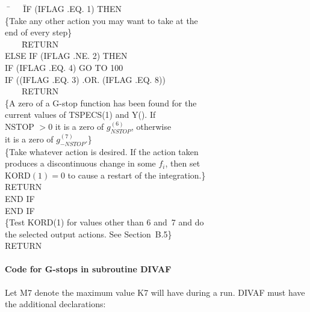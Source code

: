 \documentclass[twoside]{MATH77}
\begin{document}
\begin{tabbing}
\phantom{100}\,\=\ \ \ \ \=IF (IFLAG .EQ. 1) THEN\\

\{Take any other action you may want to take at the\\
\>end of every step\}\\

\>\>\ \ \ \ \=RETURN\\

\>\>ELSE IF (IFLAG .NE. 2) THEN\\

\>\>\>IF (IFLAG .EQ. 4) GO TO 100\\

\>\>\>IF ((IFLAG .EQ. 3) .OR. (IFLAG .EQ. 8))\\
\>\>\ \ \ \ RETURN\\

\{A zero of a G-stop function has been found for the\\
\>current values of TSPECS(1) and Y(). If\\
\>NSTOP $>0$ it is a zero of $g_{NSTOP}^{(6)}$, otherwise\\
\>it is a zero of $g_{-NSTOP}^{(7)}$.\}\\

\{Take whatever action is desired. If the action taken\\
\>produces a discontinuous change in some $f_i$, then set\\
\>KORD$(1)=0$ to cause a restart of the integration.\}\\

\>\>\>RETURN\\

\>\>END IF\\

\>END IF\\

\{Test KORD(1) for values other than 6 and~7 and do\\
\>the selected output actions. See Section\ B.5\}\\

\>RETURN
\end{tabbing}

\paragraph{Code for G-stops in subroutine DIVAF}

Let M7 denote the maximum value K7 will have during a run. DIVAF must
have the additional declarations:
\end{document}
